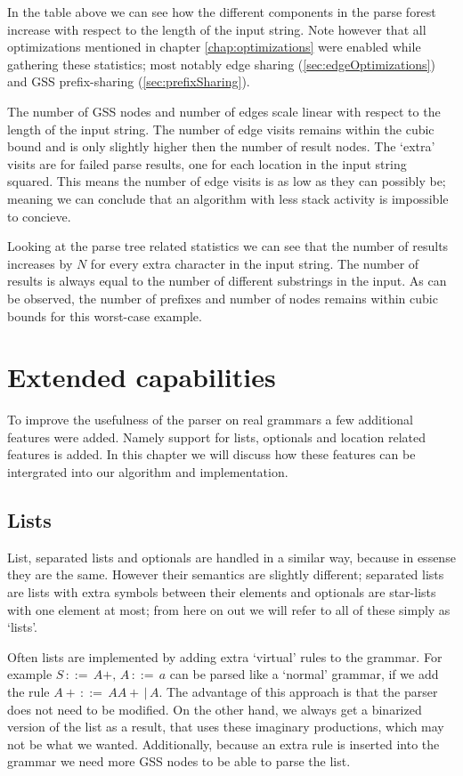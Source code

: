 \documentclass[a4paper,10pt]{article}
\begin{document}
In the table above we can see how the different components in the parse forest increase with respect to the length of the input string. Note however that all optimizations mentioned in chapter \ref{chap:optimizations} were enabled while gathering these statistics; most notably edge sharing (\ref{sec:edgeOptimizations}) and GSS prefix-sharing (\ref{sec:prefixSharing}).

The number of GSS nodes and number of edges scale linear with respect to the length of the input string. The number of edge visits remains within the cubic bound and is only slightly higher then the number of result nodes. The `extra' visits are for failed parse results, one for each location in the input string squared. This means the number of edge visits is as low as they can possibly be; meaning we can conclude that an algorithm with less stack activity is impossible to concieve.

Looking at the parse tree related statistics we can see that the number of results increases by $N$ for every extra character in the input string. The number of results is always equal to the number of different substrings in the input. As can be observed, the number of prefixes and number of nodes remains within cubic bounds for this worst-case example.

\section{Extended capabilities}

To improve the usefulness of the parser on real grammars a few additional features were added. Namely support for lists, optionals and location related features is added. In this chapter we will discuss how these features can be intergrated into our algorithm and implementation.

\subsection{Lists}

List, separated lists and optionals are handled in a similar way, because in essense they are the same. However their semantics are slightly different; separated lists are lists with extra symbols between their elements and optionals are star-lists with one element at most; from here on out we will refer to all of these simply as `lists'.

Often lists are implemented by adding extra `virtual' rules to the grammar. For example $S\,::=\,A+,\,A\,::=\,a$ can be parsed like a `normal' grammar, if we add the rule $A+\,::=\,AA+\,|\,A$. The advantage of this approach is that the parser does not need to be modified. On the other hand, we always get a binarized version of the list as a result, that uses these imaginary productions, which may not be what we wanted. Additionally, because an extra rule is inserted into the grammar we need more GSS nodes to be able to parse the list.
\end{document}
